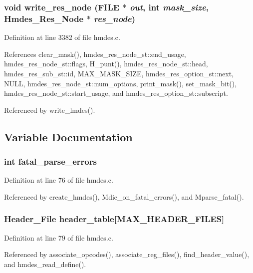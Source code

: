 \subsubsection{\setlength{\rightskip}{0pt plus 5cm}void write\_\-res\_\-node (FILE $\ast$ {\em out}, int {\em mask\_\-size}, \bf{Hmdes\_\-Res\_\-Node} $\ast$ {\em res\_\-node})}\label{hmdes_8c_e58754ae0492339071171cc7f265095f}




Definition at line 3382 of file hmdes.c.

References clear\_\-mask(), hmdes\_\-res\_\-node\_\-st::end\_\-usage, hmdes\_\-res\_\-node\_\-st::flags, H\_\-punt(), hmdes\_\-res\_\-node\_\-st::head, hmdes\_\-res\_\-sub\_\-st::id, MAX\_\-MASK\_\-SIZE, hmdes\_\-res\_\-option\_\-st::next, NULL, hmdes\_\-res\_\-node\_\-st::num\_\-options, print\_\-mask(), set\_\-mask\_\-bit(), hmdes\_\-res\_\-node\_\-st::start\_\-usage, and hmdes\_\-res\_\-option\_\-st::subscript.

Referenced by write\_\-lmdes().

\subsection{Variable Documentation}
\subsubsection{\setlength{\rightskip}{0pt plus 5cm}int \bf{fatal\_\-parse\_\-errors}}\label{hmdes_8c_d92f09f56ce353d319f5fb4f8388ddf6}




Definition at line 76 of file hmdes.c.

Referenced by create\_\-hmdes(), Mdie\_\-on\_\-fatal\_\-errors(), and Mparse\_\-fatal().
\subsubsection{\setlength{\rightskip}{0pt plus 5cm}\bf{Header\_\-File} \bf{header\_\-table}[MAX\_\-HEADER\_\-FILES]}\label{hmdes_8c_532fef42f980f82744b7a6cfd1999548}




Definition at line 79 of file hmdes.c.

Referenced by associate\_\-opcodes(), associate\_\-reg\_\-files(), find\_\-header\_\-value(), and hmdes\_\-read\_\-define().
